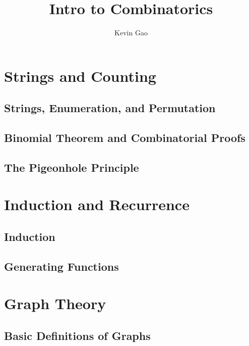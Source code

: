 \documentclass{book}
\title{Intro to Combinatorics}
\author{Kevin Gao}
\begin{document}
\frontmatter

\maketitle
\tableofcontents

\cleardoublepage

\mainmatter

\part{Strings and Counting}

\chapter{Strings, Enumeration, and Permutation}


\chapter{Binomial Theorem and Combinatorial Proofs}


\chapter{The Pigeonhole Principle}


\part{Induction and Recurrence}

\chapter{Induction}


\chapter{Generating Functions}


\part{Graph Theory}

\chapter{Basic Definitions of Graphs}

\end{document}

